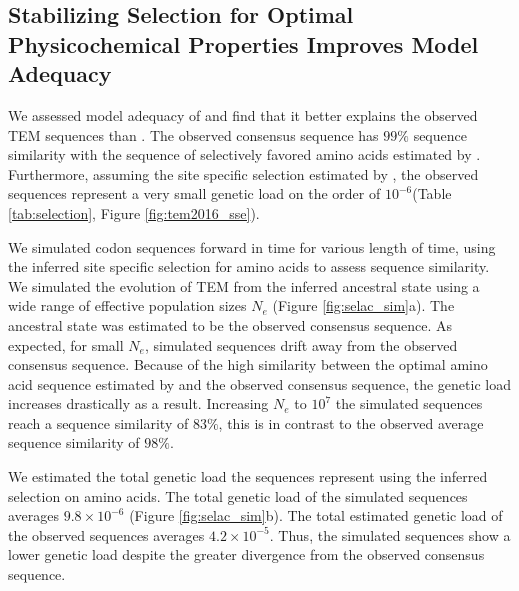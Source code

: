 \subsection{Stabilizing Selection for Optimal Physicochemical Properties Improves Model Adequacy} 
We assessed model adequacy of \selac and find that it better explains the observed TEM sequences than \phydms.
The observed consensus sequence has $99 \%$ sequence similarity with the sequence of selectively favored amino acids estimated by \selac.
Furthermore, assuming the site specific selection estimated by \selac, the observed sequences represent a very small genetic load on the order of $10^{-6}$(Table \ref{tab:selection}, Figure \ref{fig:tem2016_sse}).

We simulated codon sequences forward in time for various length of time, using the \selac inferred site specific selection for amino acids to assess sequence similarity.
We simulated the evolution of TEM from the inferred ancestral state using a wide range of effective population sizes $N_e$ (Figure \ref{fig:selac_sim}a).
The ancestral state was estimated to be the observed consensus sequence.
As expected, for small $N_e$, simulated sequences drift away from the observed consensus sequence. 
Because of the high similarity between the optimal amino acid sequence estimated by \selac and the observed consensus sequence, the genetic load increases drastically as a result.
Increasing $N_e$ to $10^7$ the simulated sequences reach a sequence similarity of $83 \%$, this is in contrast to the observed average sequence similarity of $98 \%$.

We estimated the total genetic load the sequences represent using the \selac inferred selection on amino acids.
The total genetic load of the simulated sequences averages $9.8\times10^{-6}$ (Figure \ref{fig:selac_sim}b).
The total estimated genetic load of the observed sequences averages $4.2\times 10^{-5}$.
Thus, the simulated sequences show a lower genetic load despite the greater divergence from the observed consensus sequence.

